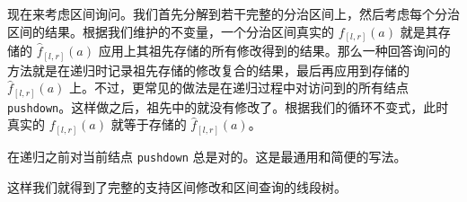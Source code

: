 现在来考虑区间询问。我们首先分解到若干完整的分治区间上，然后考虑每个分治区间的结果。根据我们维护的不变量，一个分治区间真实的 $f_{[l,r]}(a)$ 就是其存储的 $\hat f_{[l,r]}(a)$ 应用上其祖先存储的所有修改得到的结果。那么一种回答询问的方法就是在递归时记录祖先存储的修改复合的结果，最后再应用到存储的 $\hat f_{[l,r]}(a)$ 上。不过，更常见的做法是在递归过程中对访问到的所有结点 \texttt{pushdown}。这样做之后，祖先中的就没有修改了。根据我们的循环不变式，此时真实的 $f_{[l,r]}(a)$ 就等于存储的 $\hat f_{[l,r]}(a)$。

\begin{remark}
    在递归之前对当前结点 \texttt{pushdown} 总是对的。这是最通用和简便的写法。
\end{remark}

这样我们就得到了完整的支持区间修改和区间查询的线段树。

